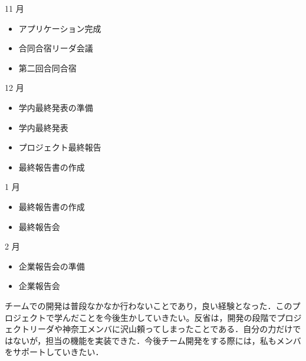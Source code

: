 11 月
\begin{itemize}
\item アプリケーション完成
\item 合同合宿リーダ会議
\item 第二回合同合宿
\end{itemize}
12 月
\begin{itemize}
\item 学内最終発表の準備
\item 学内最終発表
\item プロジェクト最終報告
\item 最終報告書の作成
\end{itemize}
1 月
\begin{itemize}
\item 最終報告書の作成
\item 最終報告会
\end{itemize}
2 月
\begin{itemize}
\item 企業報告会の準備
\item 企業報告会
\end{itemize}
\par チームでの開発は普段なかなか行わないことであり，良い経験となった．このプロジェクトで学んだことを今後生かしていきたい。反省は，開発の段階でプロジェクトリーダや神奈工メンバに沢山頼ってしまったことである．自分の力だけではないが，担当の機能を実装できた．今後チーム開発をする際には，私もメンバをサポートしていきたい．
